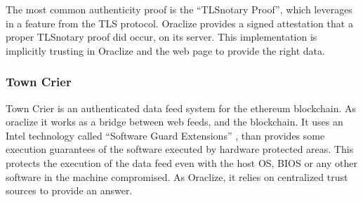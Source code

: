 The most common authenticity proof is the ``TLSnotary Proof'', which leverages
  in a feature from the TLS protocol.
Oraclize provides a signed attestation that a proper TLSnotary proof did occur,
  on its server.
This implementation is implicitly trusting in Oraclize and the web page to
  provide the right data.

\subsubsection{Town Crier}
Town Crier \cite{zhang2016town} is an authenticated data feed system for
  the ethereum blockchain.
As oraclize it works as a bridge between web feeds, and the blockchain.
It uses an Intel technology called ``Software Guard Extensions''
  \cite{costan2016intel}, than provides some execution guarantees of the software
  executed by hardware protected areas.
This protects the execution of the data feed even with the host OS, BIOS or
  any other software in the machine compromised.
As Oraclize, it relies on centralized trust sources to provide an answer.

